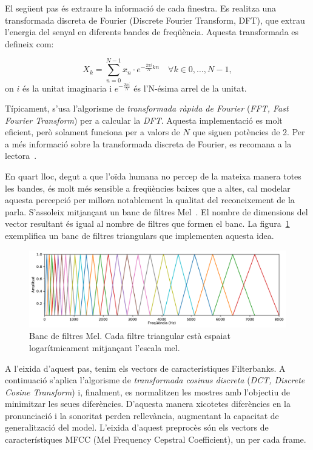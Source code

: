 El següent pas és extraure la informació de cada finestra. Es realitza una transformada discreta de Fourier (Discrete Fourier Transform, DFT), que extrau l'energia del senyal en diferents bandes de freqüència. Aquesta transformada es defineix com:

    \begin{equation}
        X_k = \sum_{n=0}^{N-1} x_n \cdot e^{- \frac{2 \pi i}{N} kn} \quad  \forall k \in{0, \dots, N-1},
    \end{equation}
    on $i$ és la unitat imaginaria i $e^{- \frac{2 \pi i}{N}}$ és l'N-ésima arrel de la unitat.

Típicament, s'usa l'algorisme de \textit{transformada ràpida de Fourier} (\textit{FFT, Fast Fourier Transform}) per a calcular la \textit{DFT}. Aquesta implementació es molt eficient, però solament funciona per a valors de $N$ que siguen potències de 2.
    Per a més informació sobre la transformada discreta de Fourier, es recomana a la lectora~\cite{mathews2012complex}.

En quart lloc, degut a que l'oïda humana no percep de la mateixa manera totes les bandes, és molt més sensible a freqüències baixes que a altes, cal modelar aquesta percepció per millora notablement la qualitat del reconeixement de la parla. S'assoleix mitjançant un banc de filtres Mel~\cite{8732232}.
El nombre de dimensions del vector resultant és igual al nombre de filtres que formen el banc. La figura~\ref{fig:mel_filterbank} exemplifica un banc de filtres triangulars que implementen aquesta idea.

    \begin{figure}[ht!]
        \centering
        \includegraphics[width=\textwidth]{figuras/mel_filterbank.pdf}
        \caption{Banc de filtres Mel. Cada filtre triangular està espaiat logarítmicament mitjançant l'escala mel.}
        \label{fig:mel_filterbank}
    \end{figure}
A l'eixida d'aquest pas, tenim els vectors de característiques Filterbanks. 
A continuació s'aplica l'algorisme de \textit{transformada cosinus discreta} (\textit{DCT, Discrete Cosine Transform}) i, finalment, es normalitzen les mostres amb l'objectiu de minimitzar les seues diferències. D'aquesta manera xicotetes diferències en la pronunciació i la sonoritat perden rellevància, augmentant la capacitat de generalització del model.
L'eixida d'aquest preprocès són els vectors de característiques MFCC (Mel Frequency Cepstral Coefficient), un per cada frame.



